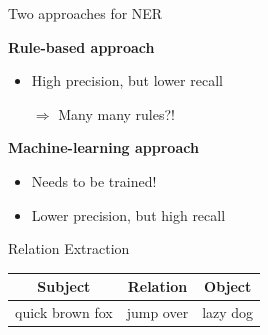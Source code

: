 \documentclass[xcolor=x11names, aspectratio=169,usenames,dvipsnames]{beamer}
\begin{document}
\begin{frame}{Two approaches for NER}
\begin{minipage}[t]{0.45\textwidth}
\textbf{Rule-based approach}
\begin{itemize}
\item High precision, but lower recall

$\Rightarrow$ \alert{Many many rules?!}
\end{itemize}
\end{minipage}\pause\pause\hfill
\begin{minipage}[t]{0.45\textwidth}
\textbf{Machine-learning approach}
\begin{itemize}
\item Needs to be trained!
\item Lower precision, but high recall
\end{itemize}
\end{minipage}
\end{frame}

\begin{frame}{Relation Extraction}
\begin{center}
\begin{tabularx}{\textwidth}{CCC}
\toprule
\textbf{Subject}&\textbf{Relation}&\textbf{Object}\\\midrule
quick brown fox&jump over&lazy dog\\
\bottomrule
\end{tabularx}
\end{center}
\end{frame}
\end{document}
